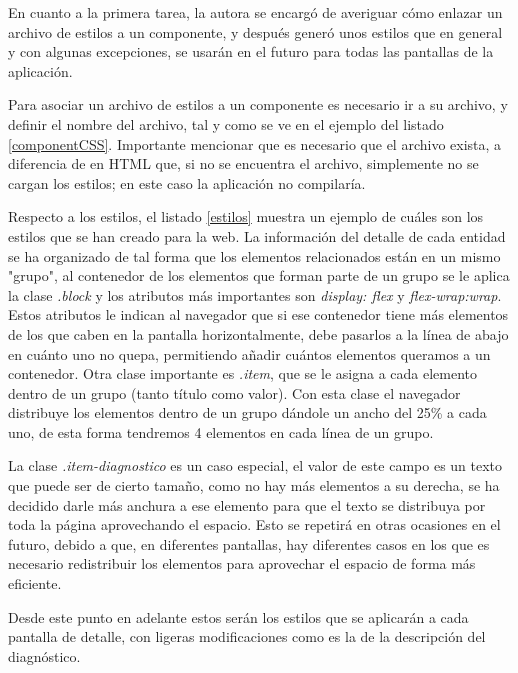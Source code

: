 En cuanto a la primera tarea, la autora se encargó de averiguar cómo enlazar un archivo de estilos a un componente, y después generó unos estilos que en general y con algunas excepciones, se usarán en el futuro para todas las pantallas de la aplicación.

Para asociar un archivo de estilos a un componente es necesario ir a su archivo, y definir el nombre del archivo, tal y como se ve en el ejemplo del listado \ref{componentCSS}. Importante mencionar que es necesario que el archivo exista, a diferencia de en HTML que, si no se encuentra el archivo, simplemente no se cargan los estilos; en este caso la aplicación no compilaría.



Respecto a los estilos, el listado \ref{estilos} muestra un ejemplo de cuáles son los estilos que se han creado para la web. La información del detalle de cada entidad se ha organizado de tal forma que los elementos relacionados están en un mismo "grupo", al contenedor de los elementos que forman parte de un grupo se le aplica la clase \emph{.block} y los atributos más importantes son \emph{display: flex} y \emph{flex-wrap:wrap}. Estos atributos le indican al navegador que si ese contenedor tiene más elementos de los que caben en la pantalla horizontalmente, debe pasarlos a la línea de abajo en cuánto uno no quepa, permitiendo añadir cuántos elementos queramos a un contenedor. Otra clase importante es \emph{.item}, que se le asigna a cada elemento dentro de un grupo (tanto título como valor). Con esta clase el navegador distribuye los elementos dentro de un grupo dándole un ancho del 25\% a cada uno, de esta forma tendremos 4 elementos en cada línea de un grupo. 

La clase \emph{.item-diagnostico} es un caso especial, el valor de este campo es un texto que puede ser de cierto tamaño, como no hay más elementos a su derecha, se ha decidido darle más anchura a ese elemento para que el texto se distribuya por toda la página aprovechando el espacio. Esto se repetirá en otras ocasiones en el futuro, debido a que, en diferentes pantallas, hay diferentes casos en los que es necesario redistribuir los elementos para aprovechar el espacio de forma más eficiente.

Desde este punto en adelante estos serán los estilos que se aplicarán a cada pantalla de detalle, con ligeras modificaciones como es la de la descripción del diagnóstico.

